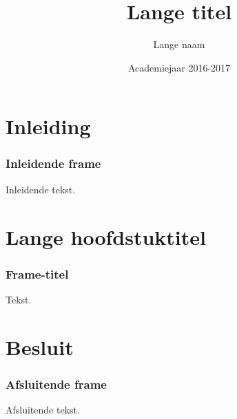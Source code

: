 \documentclass
   [kulak] %
   {kulakbeamer}
\title[Korte titel]{Lange titel}
\author[Korte naam]{Lange naam}
\institute[Kulak]{KU Leuven Kulak}
\date{Academiejaar 2016-2017}
\begin{document}
\begin{titleframe}
\titlepage
\end{titleframe}

\begin{outlineframe}[Overzicht]
\tableofcontents
\end{outlineframe}


\section{Inleiding}

\begin{frame}
\frametitle{Inleidende frame}
Inleidende tekst.
\end{frame}

\section[Korte titel]{Lange hoofdstuktitel}

\begin{frame}
\frametitle{Frame-titel}
Tekst.
\end{frame}

\section{Besluit}
\begin{frame}
\frametitle{Afsluitende frame}
Afsluitende tekst.
\end{frame}
\end{document}
